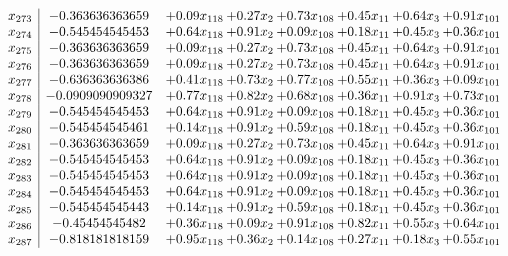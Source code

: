 \documentclass[8pt]{article}
\begin{document}
\[\begin{array}{c| c c@{\hskip 2pt} c@{\hskip 2pt} c@{\hskip 2pt} c@{\hskip 2pt} c@{\hskip 2pt} c@{\hskip 2pt} }
 x_{273}   &  -0.363636363659 & +  0.09 x_{118} & +  0.27 x_{2} & +  0.73 x_{108} & +  0.45 x_{11} & +  0.64 x_{3} & +  0.91 x_{101}\\
 x_{274}   &  -0.545454545453 & +  0.64 x_{118} & +  0.91 x_{2} & +  0.09 x_{108} & +  0.18 x_{11} & +  0.45 x_{3} & +  0.36 x_{101}\\
 x_{275}   &  -0.363636363659 & +  0.09 x_{118} & +  0.27 x_{2} & +  0.73 x_{108} & +  0.45 x_{11} & +  0.64 x_{3} & +  0.91 x_{101}\\
 x_{276}   &  -0.363636363659 & +  0.09 x_{118} & +  0.27 x_{2} & +  0.73 x_{108} & +  0.45 x_{11} & +  0.64 x_{3} & +  0.91 x_{101}\\
 x_{277}   &  -0.636363636386 & +  0.41 x_{118} & +  0.73 x_{2} & +  0.77 x_{108} & +  0.55 x_{11} & +  0.36 x_{3} & +  0.09 x_{101}\\
 x_{278}   &  -0.0909090909327 & +  0.77 x_{118} & +  0.82 x_{2} & +  0.68 x_{108} & +  0.36 x_{11} & +  0.91 x_{3} & +  0.73 x_{101}\\
 x_{279}   &  -0.545454545453 & +  0.64 x_{118} & +  0.91 x_{2} & +  0.09 x_{108} & +  0.18 x_{11} & +  0.45 x_{3} & +  0.36 x_{101}\\
 x_{280}   &  -0.545454545461 & +  0.14 x_{118} & +  0.91 x_{2} & +  0.59 x_{108} & +  0.18 x_{11} & +  0.45 x_{3} & +  0.36 x_{101}\\
 x_{281}   &  -0.363636363659 & +  0.09 x_{118} & +  0.27 x_{2} & +  0.73 x_{108} & +  0.45 x_{11} & +  0.64 x_{3} & +  0.91 x_{101}\\
 x_{282}   &  -0.545454545453 & +  0.64 x_{118} & +  0.91 x_{2} & +  0.09 x_{108} & +  0.18 x_{11} & +  0.45 x_{3} & +  0.36 x_{101}\\
 x_{283}   &  -0.545454545453 & +  0.64 x_{118} & +  0.91 x_{2} & +  0.09 x_{108} & +  0.18 x_{11} & +  0.45 x_{3} & +  0.36 x_{101}\\
 x_{284}   &  -0.545454545453 & +  0.64 x_{118} & +  0.91 x_{2} & +  0.09 x_{108} & +  0.18 x_{11} & +  0.45 x_{3} & +  0.36 x_{101}\\
 x_{285}   &  -0.545454545443 & +  0.14 x_{118} & +  0.91 x_{2} & +  0.59 x_{108} & +  0.18 x_{11} & +  0.45 x_{3} & +  0.36 x_{101}\\
 x_{286}   &  -0.45454545482 & +  0.36 x_{118} & +  0.09 x_{2} & +  0.91 x_{108} & +  0.82 x_{11} & +  0.55 x_{3} & +  0.64 x_{101}\\
 x_{287}   &  -0.818181818159 & +  0.95 x_{118} & +  0.36 x_{2} & +  0.14 x_{108} & +  0.27 x_{11} & +  0.18 x_{3} & +  0.55 x_{101}\\

\end{array}\]
\end{document}
